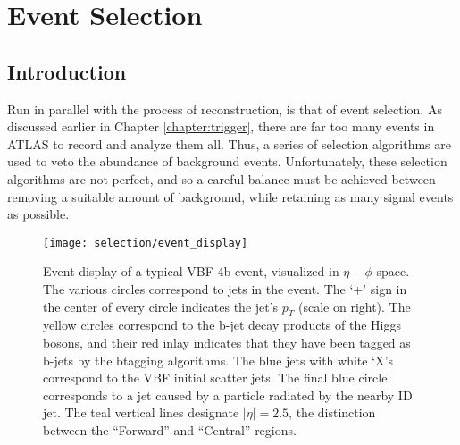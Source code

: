 \chapter{Event Selection} \label{chapter:selection}

\section{Introduction}

    Run in parallel with the process of reconstruction, is that of event selection.
    As discussed earlier in Chapter \ref{chapter:trigger},
        there are far too many events in ATLAS to record and analyze them all.
    Thus, a series of selection algorithms are used to veto the abundance of background events.
    Unfortunately, these selection algorithms are not perfect,
        and so a careful balance must be achieved between removing a suitable amount of background,
        while retaining as many signal events as possible.

    \begin{figure}[tbh]
        \texttt{[image: selection/event\_display]}
        \caption{
            Event display of a typical VBF \to 4b event, visualized in $\eta-\phi$ space.
            The various circles correspond to jets in the event.
            The `+' sign in the center of every circle indicates the jet's $p_T$ (scale on right).
            The yellow circles correspond to the b-jet decay products of the Higgs bosons,
                and their red inlay indicates that they have been tagged as b-jets by the btagging algorithms.
            The blue jets with white `X's correspond to the VBF initial scatter jets.
            The final blue circle corresponds to a jet caused by a particle radiated by the nearby ID jet.
            The teal vertical lines designate $|\eta|=2.5$,
                the distinction between the ``Forward'' and ``Central'' regions.
        }
        \label{fig:event_display}
    \end{figure}

    
